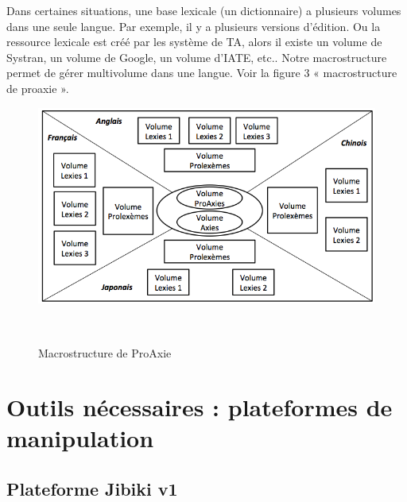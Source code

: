 \documentclass[10pt,a4paper,twoside]{article}
\begin{document}
\begin{itemize}
Dans certaines situations, une base lexicale (un dictionnaire) a plusieurs volumes dans une seule langue. Par exemple, il y a plusieurs versions d’édition. Ou la ressource lexicale est créé par les système de TA, alors il existe un volume de Systran, un volume de Google, un volume d’IATE, etc.. Notre macrostructure permet de gérer multivolume dans une langue. Voir la figure 3 « macrostructure de proaxie ».\\
\begin{figure}[htbp] 
\begin{center} 
\includegraphics[width=12cm]{images/proaxie.png}
\end{center} 
\caption{Macrostructure de ProAxie} \label{image} \
\end{figure}

\section{Outils nécessaires : plateformes de manipulation}

\subsection{Plateforme Jibiki v1}


\end{itemize}
\end{document}
